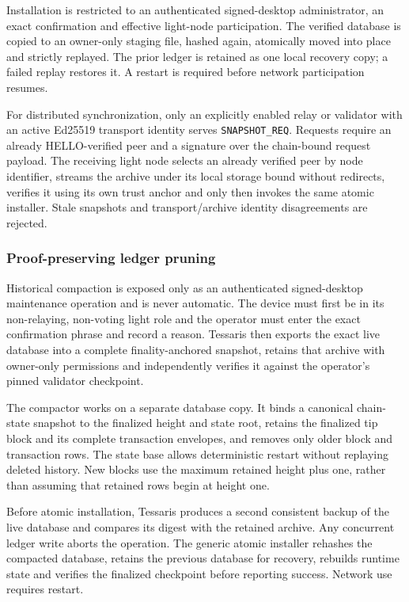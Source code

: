 Installation is restricted to an authenticated signed-desktop administrator,
an exact confirmation and effective light-node participation. The verified
database is copied to an owner-only staging file, hashed again, atomically moved
into place and strictly replayed. The prior ledger is retained as one local
recovery copy; a failed replay restores it. A restart is required before network
participation resumes.

For distributed synchronization, only an explicitly enabled relay or validator
with an active Ed25519 transport identity serves
\texttt{SNAPSHOT\_REQ}. Requests require an already HELLO-verified peer and a
signature over the chain-bound request payload. The receiving light node selects
an already verified peer by node identifier, streams the archive under its local
storage bound without redirects, verifies it using its own trust anchor and only
then invokes the same atomic installer. Stale snapshots and transport/archive
identity disagreements are rejected.

\subsubsection{Proof-preserving ledger pruning}

Historical compaction is exposed only as an authenticated signed-desktop
maintenance operation and is never automatic. The device must first be in its
non-relaying, non-voting light role and the operator must enter the exact
confirmation phrase and record a reason. Tessaris then exports the exact live
database into a complete finality-anchored snapshot, retains that archive with
owner-only permissions and independently verifies it against the operator's
pinned validator checkpoint.

The compactor works on a separate database copy. It binds a canonical chain-
state snapshot to the finalized height and state root, retains the finalized tip
block and its complete transaction envelopes, and removes only older block and
transaction rows. The state base allows deterministic restart without replaying
deleted history. New blocks use the maximum retained height plus one, rather
than assuming that retained rows begin at height one.

Before atomic installation, Tessaris produces a second consistent backup of the
live database and compares its digest with the retained archive. Any concurrent
ledger write aborts the operation. The generic atomic installer rehashes the
compacted database, retains the previous database for recovery, rebuilds runtime
state and verifies the finalized checkpoint before reporting success. Network
use requires restart.

